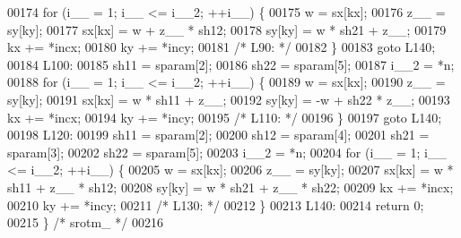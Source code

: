 \begin{DoxyCode}
00174     \textcolor{keywordflow}{for} (i\_\_ = 1; i\_\_ <= i\_\_2; ++i\_\_) \{
00175     w = sx[kx];
00176     z\_\_ = sy[ky];
00177     sx[kx] = w + z\_\_ * sh12;
00178     sy[ky] = w * sh21 + z\_\_;
00179     kx += *incx;
00180     ky += *incy;
00181 \textcolor{comment}{/* L90: */}
00182     \}
00183     \textcolor{keywordflow}{goto} L140;
00184 L100:
00185     sh11 = sparam[2];
00186     sh22 = sparam[5];
00187     i\_\_2 = *n;
00188     \textcolor{keywordflow}{for} (i\_\_ = 1; i\_\_ <= i\_\_2; ++i\_\_) \{
00189     w = sx[kx];
00190     z\_\_ = sy[ky];
00191     sx[kx] = w * sh11 + z\_\_;
00192     sy[ky] = -w + sh22 * z\_\_;
00193     kx += *incx;
00194     ky += *incy;
00195 \textcolor{comment}{/* L110: */}
00196     \}
00197     \textcolor{keywordflow}{goto} L140;
00198 L120:
00199     sh11 = sparam[2];
00200     sh12 = sparam[4];
00201     sh21 = sparam[3];
00202     sh22 = sparam[5];
00203     i\_\_2 = *n;
00204     \textcolor{keywordflow}{for} (i\_\_ = 1; i\_\_ <= i\_\_2; ++i\_\_) \{
00205     w = sx[kx];
00206     z\_\_ = sy[ky];
00207     sx[kx] = w * sh11 + z\_\_ * sh12;
00208     sy[ky] = w * sh21 + z\_\_ * sh22;
00209     kx += *incx;
00210     ky += *incy;
00211 \textcolor{comment}{/* L130: */}
00212     \}
00213 L140:
00214     \textcolor{keywordflow}{return} 0;
00215 \} \textcolor{comment}{/* srotm\_ */}
00216 
\end{DoxyCode}
